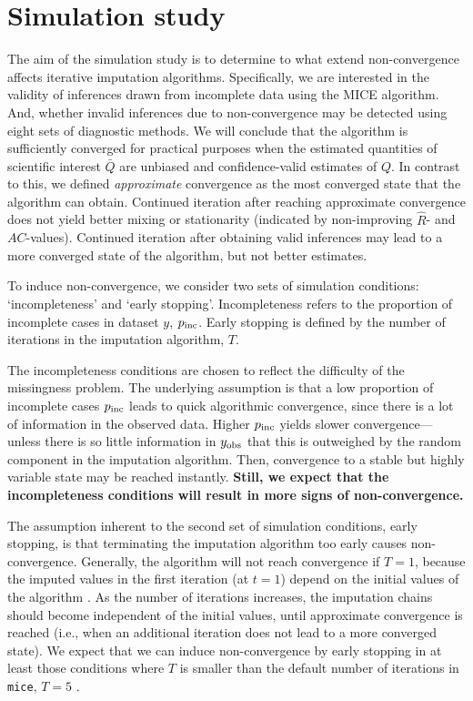\documentclass[Royal,times,sageh]{sagej}
\begin{document}
\hypertarget{simulation-study}{%
\section{Simulation study}\label{simulation-study}}

The aim of the simulation study is to determine to what extend non-convergence affects iterative imputation algorithms. Specifically, we are interested in the validity of inferences drawn from incomplete data using the MICE algorithm. And, whether invalid inferences due to non-convergence may be detected using eight sets of diagnostic methods. We will conclude that the algorithm is sufficiently converged for practical purposes when the estimated quantities of scientific interest \(\bar{Q}\) are unbiased and confidence-valid estimates of \({Q}\). In contrast to this, we defined \emph{approximate} convergence as the most converged state that the algorithm can obtain. Continued iteration after reaching approximate convergence does not yield better mixing or stationarity (indicated by non-improving \(\widehat{R}\)- and \(AC\)-values). Continued iteration after obtaining valid inferences may lead to a more converged state of the algorithm, but not better estimates.

To induce non-convergence, we consider two sets of simulation conditions: `incompleteness' and `early stopping'. Incompleteness refers to the proportion of incomplete cases in dataset \(y\), \(p_{\rm inc}\). Early stopping is defined by the number of iterations in the imputation algorithm, \(T\).

The incompleteness conditions are chosen to reflect the difficulty of the missingness problem. The underlying assumption is that a low proportion of incomplete cases \(p_{\rm inc}\) leads to quick algorithmic convergence, since there is a lot of information in the observed data. Higher \(p_{\rm inc}\) yields slower convergence---unless there is so little information in \(y_{\rm obs}\) that this is outweighed by the random component in the imputation algorithm. Then, convergence to a stable but highly variable state may be reached instantly. \textbf{Still, we expect that the incompleteness conditions will result in more signs of non-convergence.}

The assumption inherent to the second set of simulation conditions, early stopping, is that terminating the imputation algorithm too early causes non-convergence. Generally, the algorithm will not reach convergence if \(T=1\), because the imputed values in the first iteration (at \(t=1\)) depend on the initial values of the algorithm \citep[which are sampled randomly from the set of observed datapoints;][]{buur18}. As the number of iterations increases, the imputation chains should become independent of the initial values, until approximate convergence is reached (i.e., when an additional iteration does not lead to a more converged state). We expect that we can induce non-convergence by early stopping in at least those conditions where \(T\) is smaller than the default number of iterations in \texttt{mice}, \(T=5\) \citep{mice}.
\end{document}
